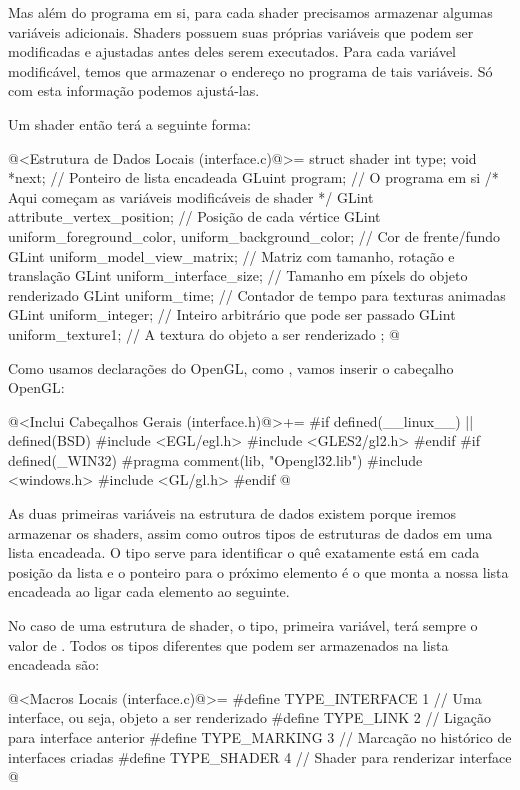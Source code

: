 Mas além do programa em si, para cada shader precisamos armazenar
algumas variáveis adicionais. Shaders possuem suas próprias variáveis
que podem ser modificadas e ajustadas antes deles serem
executados. Para cada variável modificável, temos que armazenar o
endereço no programa de tais variáveis. Só com esta informação podemos
ajustá-las.

Um shader então terá a seguinte forma:

\iniciocodigo
@<Estrutura de Dados Locais (interface.c)@>=
struct shader {
  int type;
  void *next; // Ponteiro de lista encadeada
  GLuint program; // O programa em si
  /* Aqui começam as variáveis modificáveis de shader */
  GLint attribute_vertex_position; // Posição de cada vértice
  GLint uniform_foreground_color, uniform_background_color; // Cor de frente/fundo
  GLint uniform_model_view_matrix; // Matriz com tamanho, rotação e translação
  GLint uniform_interface_size; // Tamanho em píxels do objeto renderizado
  GLint uniform_time; // Contador de tempo para texturas animadas
  GLint uniform_integer; // Inteiro arbitrário que pode ser passado
  GLint uniform_texture1; // A textura do objeto a ser renderizado
};
@
\fimcodigo

Como usamos declarações do OpenGL, como , vamos
inserir o cabeçalho OpenGL:

\iniciocodigo
@<Inclui Cabeçalhos Gerais (interface.h)@>+=
#if defined(__linux__) || defined(BSD)
#include <EGL/egl.h>
#include <GLES2/gl2.h>
#endif
#if defined(_WIN32)
#pragma comment(lib, "Opengl32.lib")
#include <windows.h>
#include <GL/gl.h>
#endif
@
\fimcodigo


As duas primeiras variáveis na estrutura de dados existem porque
iremos armazenar os shaders, assim como outros tipos de estruturas de
dados em uma lista encadeada. O tipo serve para identificar o quê
exatamente está em cada posição da lista e o ponteiro para o próximo
elemento é o que monta a nossa lista encadeada ao ligar cada elemento
ao seguinte.

No caso de uma estrutura de shader, o tipo, primeira variável, terá
sempre o valor de . Todos os tipos diferentes
que podem ser armazenados na lista encadeada são:

\iniciocodigo
@<Macros Locais (interface.c)@>=
#define TYPE_INTERFACE 1 // Uma interface, ou seja, objeto a ser renderizado
#define TYPE_LINK      2 // Ligação para interface anterior
#define TYPE_MARKING   3 // Marcação no histórico de interfaces criadas
#define TYPE_SHADER    4 // Shader para renderizar interface
@
\fimcodigo

